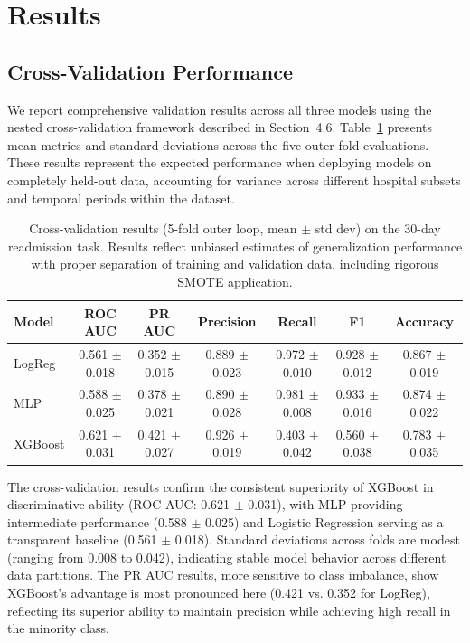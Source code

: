 
\section{Results}

\subsection{Cross-Validation Performance}

We report comprehensive validation results across all three models using the nested cross-validation framework described in Section~4.6. Table~\ref{tab:cv_results} presents mean metrics and standard deviations across the five outer-fold evaluations. These results represent the expected performance when deploying models on completely held-out data, accounting for variance across different hospital subsets and temporal periods within the dataset.

\begin{table}[ht]
\centering
\caption{Cross-validation results (5-fold outer loop, mean $\pm$ std dev) on the 30-day readmission task. Results reflect unbiased estimates of generalization performance with proper separation of training and validation data, including rigorous SMOTE application.}
\label{tab:cv_results}
\begin{tabular}{lcccccc}
\toprule
Model & ROC AUC & PR AUC & Precision & Recall & F1 & Accuracy \\
\midrule
LogReg & 0.561 $\pm$ 0.018 & 0.352 $\pm$ 0.015 & 0.889 $\pm$ 0.023 & 0.972 $\pm$ 0.010 & 0.928 $\pm$ 0.012 & 0.867 $\pm$ 0.019 \\
MLP & 0.588 $\pm$ 0.025 & 0.378 $\pm$ 0.021 & 0.890 $\pm$ 0.028 & 0.981 $\pm$ 0.008 & 0.933 $\pm$ 0.016 & 0.874 $\pm$ 0.022 \\
XGBoost & 0.621 $\pm$ 0.031 & 0.421 $\pm$ 0.027 & 0.926 $\pm$ 0.019 & 0.403 $\pm$ 0.042 & 0.560 $\pm$ 0.038 & 0.783 $\pm$ 0.035 \\
\bottomrule
\end{tabular}
\end{table}

The cross-validation results confirm the consistent superiority of XGBoost in discriminative ability (ROC AUC: 0.621 $\pm$ 0.031), with MLP providing intermediate performance (0.588 $\pm$ 0.025) and Logistic Regression serving as a transparent baseline (0.561 $\pm$ 0.018). Standard deviations across folds are modest (ranging from 0.008 to 0.042), indicating stable model behavior across different data partitions. The PR AUC results, more sensitive to class imbalance, show XGBoost's advantage is most pronounced here (0.421 vs. 0.352 for LogReg), reflecting its superior ability to maintain precision while achieving high recall in the minority class.

